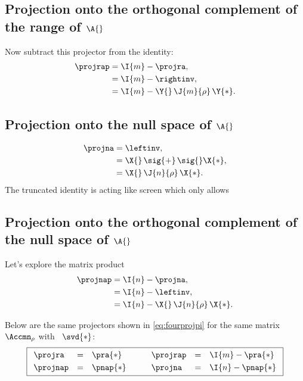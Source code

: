 \subsection{Projection onto the orthogonal complement of the range of $\A{}$}
Now subtract this projector from the identity:
\begin{equation}
  \begin{split}
    \projrap& = \I{m}-\projra,\\
      &= \I{m}-\rightinv,\\
      &= \I{m} - \Y{}\,\J{m}{\rho}\,\Y{*}.
  \end{split}
\end{equation}

\subsection{Projection onto the null space of $\A{}$}
\begin{equation}
  \begin{split}
    \projna &= \leftinv,\\
    &= \X{}\,\sig{+}\,\sig{}\X{*},\\
    & = \X{}\,\J{n}{\rho}\,\X{*}.
  \end{split}
\end{equation}The truncated identity is acting like screen which only allows 
\subsection{Projection onto the orthogonal complement of the null space of $\A{}$}
Let's explore the matrix product
\begin{equation}
  \begin{split}
    \projnap& = \I{n}-\projna,\\
      &= \I{n}-\leftinv,\\
      &= \I{n} - \X{}\,\J{n}{\rho}\,\X{*}.
  \end{split}
\end{equation}

Below are the same projectors shown in \eqref{eq:fourprojpi} for the same matrix $\Accmn_{\rho}$ with \svdl\ $\svd{*}$:
\begin{equation}
\boxed{
  \begin{array}{lcllcl}
    \projra&  = &\pra{*}  & \qquad  \projrap & = & \I{m}-\pra{*}\\[3pt]
    \projnap& = &\pnap{*} & \qquad  \projna  & = & \I{n}-\pnap{*}\\    
  \end{array}
  }
  \label{eq:fourprojsvd}
\end{equation}

